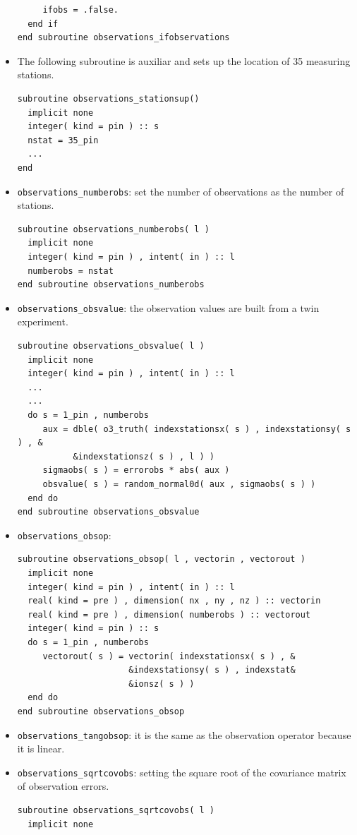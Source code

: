 \documentclass[12pt]{article}
\begin{document}
\begin{itemize}
\begin{verbatim}
     ifobs = .false.
  end if
end subroutine observations_ifobservations
\end{verbatim}
\item The following subroutine is auxiliar and sets up the location of 35 measuring stations.
\begin{verbatim}
subroutine observations_stationsup()
  implicit none
  integer( kind = pin ) :: s
  nstat = 35_pin
  ...
end
\end{verbatim}
\item {\tt observations\_numberobs}: set the number of observations as the number of stations.
\begin{verbatim}
subroutine observations_numberobs( l )
  implicit none
  integer( kind = pin ) , intent( in ) :: l
  numberobs = nstat
end subroutine observations_numberobs
\end{verbatim}
\item {\tt observations\_obsvalue}: the observation values are built from a twin experiment.
\begin{verbatim}
subroutine observations_obsvalue( l )
  implicit none
  integer( kind = pin ) , intent( in ) :: l
  ... 
  ...
  do s = 1_pin , numberobs
     aux = dble( o3_truth( indexstationsx( s ) , indexstationsy( s ) , &
           &indexstationsz( s ) , l ) )
     sigmaobs( s ) = errorobs * abs( aux )
     obsvalue( s ) = random_normal0d( aux , sigmaobs( s ) )
  end do
end subroutine observations_obsvalue
\end{verbatim}
\item {\tt observations\_obsop}: 
\begin{verbatim}
subroutine observations_obsop( l , vectorin , vectorout )
  implicit none
  integer( kind = pin ) , intent( in ) :: l
  real( kind = pre ) , dimension( nx , ny , nz ) :: vectorin
  real( kind = pre ) , dimension( numberobs ) :: vectorout
  integer( kind = pin ) :: s
  do s = 1_pin , numberobs
     vectorout( s ) = vectorin( indexstationsx( s ) , &
                      &indexstationsy( s ) , indexstat&
                      &ionsz( s ) )
  end do
end subroutine observations_obsop
\end{verbatim}
\item {\tt observations\_tangobsop}: it is the same as the observation operator because it is linear.
\item {\tt observations\_sqrtcovobs}: setting the square root of the covariance matrix of observation errors.
\begin{verbatim}
subroutine observations_sqrtcovobs( l )
  implicit none

\end{verbatim}
\end{itemize}
\end{document}
